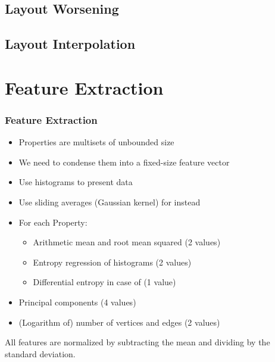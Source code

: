 \documentclass{beamer}
\begin{document}
\subsection{Layout Worsening}

\nocite{Schaefer2006}

\subsection{Layout Interpolation}


\section{Feature Extraction}
\begin{frame}
  \frametitle{Feature Extraction}
  \begin{itemize}
  \item Properties are multisets of unbounded size
  \item We need to condense them into a fixed-size feature vector
  \item Use histograms to present data
  \item Use sliding averages (\alert<2>{Gaussian kernel}) for  instead
  \item For each Property:
    \begin{itemize}
    \item Arithmetic mean and root mean squared (2 values)
    \item Entropy regression of histograms (2 values)
    \item Differential entropy in case of  (1 value)
    \end{itemize}
  \item Principal components (4 values)
  \item (Logarithm of) number of vertices and edges (2 values)
  \end{itemize}
  \par\bigskip
  All features are normalized by subtracting the mean and dividing by the standard deviation.
\end{frame}
\end{document}
